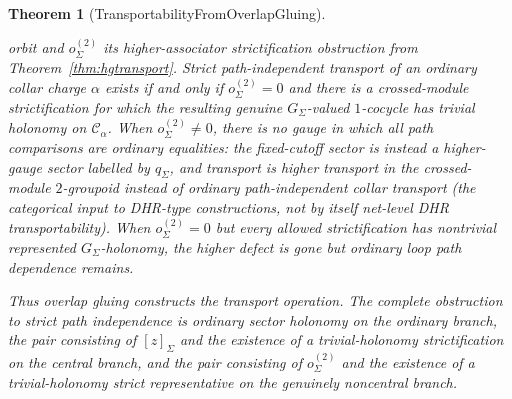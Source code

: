 \documentclass[11pt]{article}
\newtheorem{theorem}{Theorem}[section]
\begin{document}
\begin{theorem}[TransportabilityFromOverlapGluing]
\begin{enumerate}[label=\textup{(\roman*)},leftmargin=2em]
orbit and \(o^{(2)}_\Sigma\) its higher-associator strictification obstruction from
Theorem~\ref{thm:hgtransport}. Strict path-independent transport
of an ordinary collar charge \(\alpha\) exists if and only if \(o^{(2)}_\Sigma=0\) and there is a
crossed-module strictification for which the resulting genuine \(G_\Sigma\)-valued
\(1\)-cocycle has trivial holonomy on \(\mathcal C_\alpha\). When \(o^{(2)}_\Sigma\ne0\), there is no gauge in
which all path comparisons are ordinary equalities: the fixed-cutoff sector is instead a
higher-gauge sector labelled by \(q_\Sigma\), and transport is higher transport in the
crossed-module \(2\)-groupoid instead of ordinary path-independent collar transport (the
categorical input to DHR-type constructions, not by itself net-level DHR transportability). When
\(o^{(2)}_\Sigma=0\) but every allowed strictification has nontrivial represented
\(G_\Sigma\)-holonomy, the higher defect is gone but ordinary loop path dependence remains.
\end{enumerate}
Thus overlap gluing constructs the transport operation. The complete obstruction to strict path
independence is ordinary sector holonomy on the ordinary branch, the pair consisting of
\([z]_\Sigma\) and the existence of a trivial-holonomy strictification on the central branch, and
the pair consisting of \(o^{(2)}_\Sigma\) and the existence of a trivial-holonomy strict
representative on the genuinely noncentral branch.
\end{theorem}
\end{document}
